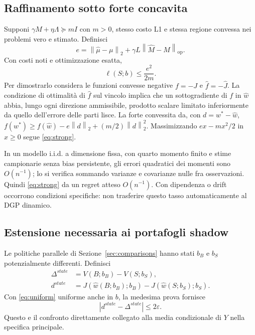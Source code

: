 \documentclass[11pt,a4paper]{article}
\theoremstyle{definition}\newtheorem{definition}[theorem]{Definizione}
\theoremstyle{remark}\newtheorem{remark}[theorem]{Osservazione}
\newcommand{\op}{\mathrm{op}}\newcommand{\ind}{\mathbf 1}\newcommand{\pos}[1]{\left[#1\right]_+}
\newcommand{\norm}[1]{\left\lVert#1\right\rVert}\newcommand{\abs}[1]{\left|#1\right|}
\begin{document}
\subsection{Raffinamento sotto forte concavita}
Supponi $\gamma M+\eta\Lambda\succeq mI$ con $m>0$, stesso costo L1 e stessa regione convessa nei problemi vero e stimato. Definisci
\begin{equation}
 e=\norm{\widehat\mu-\mu}_2+\gamma L\norm{\widehat M-M}_{\op}.
\end{equation}
Con costi noti e ottimizzazione esatta,
\begin{equation}
 \ell(S;b)\le\frac{e^2}{2m}.\label{eq:strong}
\end{equation}
Per dimostrarlo considera le funzioni convesse negative $f=-J$ e $\widehat f=-\widehat J$. La condizione di ottimalità di $\widehat f$ sul vincolo implica che un sottogradiente di $f$ in $\widehat w$ abbia, lungo ogni direzione ammissibile, prodotto scalare limitato inferiormente da quello dell'errore delle parti lisce. La forte convessita da, con $d=w^*-\widehat w$,
$f(w^*)\ge f(\widehat w)-e\norm d_2+(m/2)\norm d_2^2$. Massimizzando $e x-mx^2/2$ in $x\ge0$ segue \eqref{eq:strong}.

In un modello i.i.d. a dimensione fissa, con quarto momento finito e stime campionarie senza bias persistente, gli errori quadratici dei momenti sono $O(n^{-1})$; lo si verifica sommando varianze e covarianze nulle fra osservazioni. Quindi \eqref{eq:strong} da un regret atteso $O(n^{-1})$. Con dipendenza o drift occorrono condizioni specifiche: non trasferire questo tasso automaticamente al DGP dinamico.

\subsection{Estensione necessaria ai portafogli shadow}
Le politiche parallele di Sezione~\ref{sec:comparisons} hanno stati $b_B$ e $b_S$ potenzialmente differenti. Definisci
\begin{align}
 \Delta^{state}&=V(B;b_B)-V(S;b_S),\\
 d^{state}&=J(\widehat w(B;b_B);b_B)-J(\widehat w(S;b_S);b_S).
\end{align}
Con \eqref{eq:uniform} uniforme anche in $b$, la medesima prova fornisce
\begin{equation}
 |d^{state}-\Delta^{state}|\le2\varepsilon.\label{eq:T4state}
\end{equation}
Questo e il confronto direttamente collegato alla media condizionale di $Y$ nella specifica principale.
\end{document}

